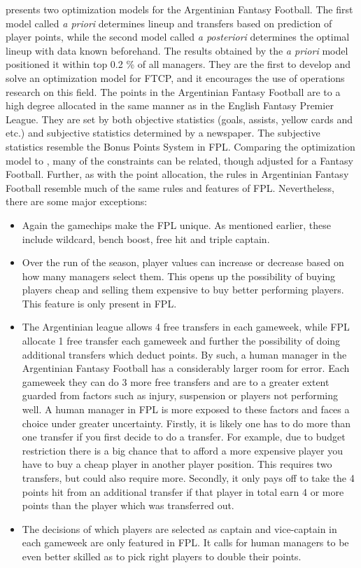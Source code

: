 \newpar

\cite{Bonomo} presents two optimization models for the Argentinian Fantasy Football. The first model called \textit{a priori} determines lineup and transfers based on prediction of player points, while the second model called \textit{a posteriori} determines the optimal lineup with data known beforehand. The results obtained by the \textit{a priori} model positioned it within top 0.2 \% of all managers. They are the first to develop and solve an optimization model for FTCP, and it encourages the use of operations research on this field. The points in the Argentinian Fantasy Football are to a high degree allocated in the same manner as in the English Fantasy Premier League. They are set by both objective statistics (goals, assists, yellow cards and etc.) and subjective statistics determined by a newspaper. The subjective statistics resemble the Bonus Points System in FPL. Comparing the optimization model to \cite{Mathsports}, many of the constraints can be related, though adjusted for a Fantasy Football. Further, as with the point allocation, the rules in Argentinian Fantasy Football resemble much of the same rules and features of FPL. Nevertheless, there are some major exceptions: 


\begin{itemize}
    \item  Again the gamechips make the FPL unique. As mentioned earlier, these include wildcard, bench boost, free hit and triple captain.  
    \item Over the run of the season, player values can increase or decrease based on how many managers select them. This opens up the possibility of buying players cheap and selling them expensive to buy better performing players. This feature is only present in FPL.
    \item The Argentinian league allows 4 free transfers in each gameweek, while FPL allocate 1 free transfer each gameweek and further the possibility of doing additional transfers which deduct points. By such, a human manager in the Argentinian Fantasy Football has a considerably larger room for error. Each gameweek they can do 3 more free transfers and are to a greater extent guarded from factors such as injury, suspension or players not performing well. A human manager in FPL is more exposed to these factors and faces a choice under greater uncertainty. Firstly, it is likely one has to do more than one transfer if you first decide to do a transfer. For example, due to budget restriction there is a big chance that to afford a more expensive player you have to buy a cheap player in another player position. This requires two transfers, but could also require more. Secondly, it only pays off to take the 4 points hit from an additional transfer if that player in total earn 4 or more points than the player which was transferred out. 
    \item The decisions of which players are selected as captain and vice-captain in each gameweek are only featured in FPL. It calls for human managers to be even better skilled as to pick right players to double their points. 
\end{itemize}

